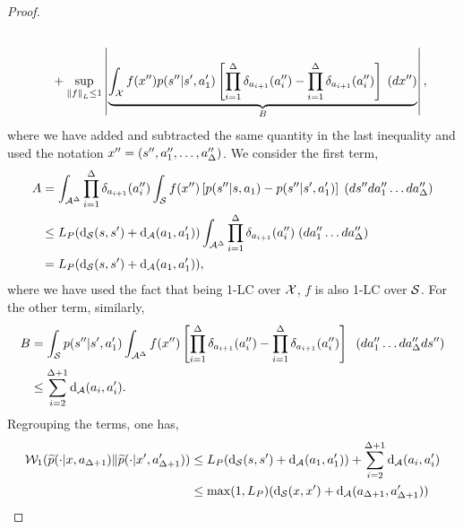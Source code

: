 \begin{proof}
\begin{align*}
        \\
        &\qquad + \sup_{\left\Vert f\right\Vert_L\leq 1} \left\vert \underbrace{\int_{\augmentedstatespace} f(x'')\transitionfunction(s''\vert s',a_{1}') \left[\prod_{i=1}^{\delay}\delta_{a_{i+1}}(a_i'')-\prod_{i=1}^{\delay}\delta_{a_{i+1}}(a_i'')\right]\; (dx'')}_{B} \right\vert,
    \end{align*}     
    where we have added and subtracted the same quantity in the last inequality and used the notation $x''=(s'',a_1'',\dots,a_\delay'')$.
    We consider the first term,
    \begin{align*}
        A &= \int_{\actionspace^\delay} \prod_{i=1}^{\delay}\delta_{a_{i+1}}(a_i'') \int_{\statespace}f(x'')\left[\transitionfunction(s''\vert s,a_{1})-\transitionfunction(s''\vert s',a_{1}')\right]\;(ds'' da_1'' \dots da_{\delay}'')
        \\
        &\le L_P(\distance_{\statespace}(s,s') + \distance_{\actionspace}(a_1,a_1')) \int_{\actionspace^
        {\delay}} \prod_{i=1}^{\delay}\delta_{a_{i+1}}(a_i'')  \;(da_1'' \dots da_{\delay}'')
        \\
        &= L_P(\distance_{\statespace}(s,s') + \distance_{\actionspace}(a_1,a_1')),
    \end{align*}
    where we have used the fact that being 1-LC over $\augmentedstatespace$, $f$ is also 1-LC over $\statespace$.
    For the other term, similarly,
    \begin{align*}
        B &=\int_{\statespace}\transitionfunction(s''\vert s',a_{1}') \int_{\actionspace^\delay}f(x'') \left[\prod_{i=1}^{\delay}\delta_{a_{i+1}}(a_i'')-\prod_{i=1}^{\delay}\delta_{a_{i+1}}(a_i'')\right]\;\;(da_1'' \dots da_{\delay}''ds'')
        \\
        &\leq \sum_{i=2}^{\delay+1}\distance_{\actionspace}(a_{i},a_{i}').
    \end{align*}
    Regrouping the terms, one has,
    \begin{align*}
        \wassersteindistance[1](\augmentedtransitionfunction(\cdot\vert x,a_{\delay+1})\Vert \augmentedtransitionfunction(\cdot\vert x',a_{\delay+1}'))
        &\le L_P(\distance_{\statespace}(s,s') + \distance_{\actionspace}(a_1,a_1')) + \sum_{i=2}^{\delay+1}\distance_{\actionspace}(a_{i},a_{i}')
        \\
        &\le \max(1,L_P) (\distance_{\statespace}(x,x') + \distance_{\actionspace}(a_{\delay+1},a_{\delay+1}'))
    \end{align*}
\end{proof}


